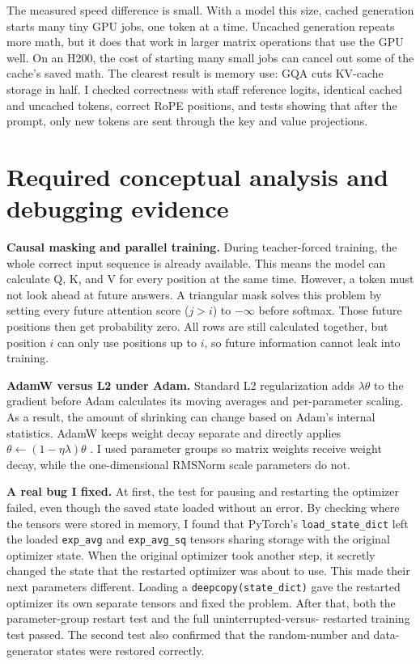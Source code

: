 \documentclass[10pt]{article}
\begin{document}
The measured speed difference is small. With a model this size, cached generation starts many tiny
GPU jobs, one token at a time. Uncached generation repeats more math, but it does that work in
larger matrix operations that use the GPU well. On an H200, the cost of starting many small jobs can
cancel out some of the cache's saved math. The clearest result is memory use: GQA cuts KV-cache
storage in half. I checked correctness with staff reference logits, identical cached and uncached
tokens, correct RoPE positions, and tests showing that after the prompt, only new tokens are sent
through the key and value projections.

\section{Required conceptual analysis and debugging evidence}

\textbf{Causal masking and parallel training.} During teacher-forced training, the whole correct
input sequence is already available. This means the model can calculate Q, K, and V for every
position at the same time. However, a token must not look ahead at future answers. A triangular
mask solves this problem by setting every future attention score ($j>i$) to $-\infty$ before
softmax. Those future positions then get probability zero. All rows are still calculated together,
but position $i$ can only use positions up to $i$, so future information cannot leak into training.

\textbf{AdamW versus L2 under Adam.} Standard L2 regularization adds $\lambda\theta$ to the
gradient before Adam calculates its moving averages and per-parameter scaling. As a result, the
amount of shrinking can change based on Adam's internal statistics. AdamW keeps weight decay
separate and directly applies $\theta\leftarrow(1-\eta\lambda)\theta$
\cite{loshchilov2019adamw}. I used parameter groups so matrix weights receive weight decay, while
the one-dimensional RMSNorm scale parameters do not.

\textbf{A real bug I fixed.} At first, the test for pausing and restarting the optimizer failed,
even though the saved state loaded without an error. By checking where the tensors were stored in
memory, I found that PyTorch's \texttt{load\_state\_dict} left the loaded
\texttt{exp\_avg} and \texttt{exp\_avg\_sq} tensors sharing storage with the original optimizer
state. When the original optimizer took another step, it secretly changed the state that the
restarted optimizer was about to use. This made their next parameters different. Loading a
\texttt{deepcopy(state\_dict)} gave the restarted optimizer its own separate tensors and fixed the
problem. After that, both the parameter-group restart test and the full uninterrupted-versus-
restarted training test passed. The second test also confirmed that the random-number and data-
generator states were restored correctly.
\end{document}
